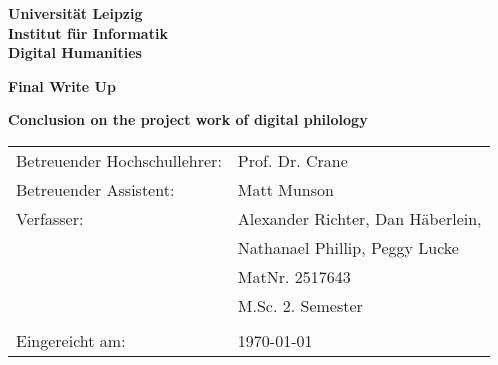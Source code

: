 \thispagestyle{empty}
\begin{center}
\textbf{\sffamily	Universität Leipzig\\
			Institut für Informatik \\
			Digital Humanities\\}
\end{center}

\begin{center}
\vspace{4cm}
{\textbf{\sffamily Final Write Up }}
\end{center}


\begin{center}
	\vspace{1cm}
	\textbf{\sffamily Conclusion on the project work of digital philology }\\
	\vspace{2.5cm}
\end{center}
\vfill

\begin{center}
	{\large
	\begin{tabular}{p{7cm} l}
	
	\small Betreuender Hochschullehrer:		&\small Prof. Dr. Crane\\
	\small Betreuender Assistent: 	 		&\small Matt Munson\\
	\small Verfasser: 						&\small Alexander Richter, Dan Häberlein,  \\
											& \small Nathanael Phillip, Peggy Lucke\\
											& \small MatNr. 2517643\\
											& \small M.Sc. 2. Semester\\
											& \\
	\small Eingereicht am: 					& \small \today
	
	\end{tabular}}
\end{center}